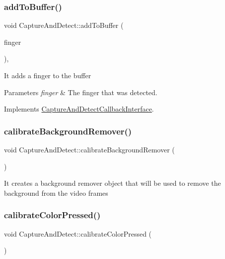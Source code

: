 \subsubsection{\texorpdfstring{add\+To\+Buffer()}{addToBuffer()}}
{\footnotesize\ttfamily void Capture\+And\+Detect\+::add\+To\+Buffer (\begin{DoxyParamCaption}\item[{\hyperlink{classFingerAndCoordinates}{Finger\+And\+Coordinates}}]{finger }\end{DoxyParamCaption})\hspace{0.3cm}{\ttfamily [override]}, {\ttfamily [virtual]}}

It adds a finger to the buffer


\begin{DoxyParams}{Parameters}
{\em finger} & The finger that was detected. \\
\hline
\end{DoxyParams}


Implements \hyperlink{classCaptureAndDetectCallbackInterface_a259dc71fd5d02424b91906d708e7de1f}{Capture\+And\+Detect\+Callback\+Interface}.

\mbox{\label{classCaptureAndDetect_a53065abfb6eed6c074ad4d3370b3f232}} 
\subsubsection{\texorpdfstring{calibrate\+Background\+Remover()}{calibrateBackgroundRemover()}}
{\footnotesize\ttfamily void Capture\+And\+Detect\+::calibrate\+Background\+Remover (\begin{DoxyParamCaption}{ }\end{DoxyParamCaption})}

It creates a background remover object that will be used to remove the background from the video frames \mbox{\label{classCaptureAndDetect_ac60f9b1d192c043fa9b40c38fc5599e6}} 
\subsubsection{\texorpdfstring{calibrate\+Color\+Pressed()}{calibrateColorPressed()}}
{\footnotesize\ttfamily void Capture\+And\+Detect\+::calibrate\+Color\+Pressed (\begin{DoxyParamCaption}{ }\end{DoxyParamCaption})}

